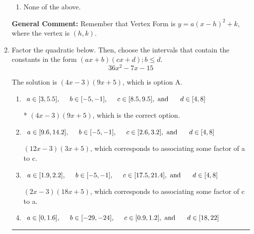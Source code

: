 \documentclass{extbook}[14pt]
\newcommand{\litem}[1]{\item #1

\rule{\textwidth}{0.4pt}}
\begin{document}
\begin{enumerate}
{\begin{enumerate}[label=\Alph*.]
\item None of the above.\end{enumerate}
\textbf{General Comment:} Remember that Vertex Form is $y = a(x-h)^2+k$, where the vertex is $(h, k)$.
}
\litem{
Factor the quadratic below. Then, choose the intervals that contain the constants in the form $(ax+b)(cx+d); b \leq d.$
\[ 36x^{2} -7 x -15 \]

The solution is \( (4x -3)(9x + 5) \), which is option A.\begin{enumerate}[label=\Alph*.]
\item \( a \in [3, 5.5], \hspace*{5mm} b \in [-5, -1], \hspace*{5mm} c \in [8.5, 9.5], \text{ and } \hspace*{5mm} d \in [4, 8] \)

* $(4x -3)(9x + 5)$, which is the correct option.
\item \( a \in [9.6, 14.2], \hspace*{5mm} b \in [-5, -1], \hspace*{5mm} c \in [2.6, 3.2], \text{ and } \hspace*{5mm} d \in [4, 8] \)

 $(12x -3)(3x + 5)$, which corresponds to associating some factor of a to c.
\item \( a \in [1.9, 2.2], \hspace*{5mm} b \in [-5, -1], \hspace*{5mm} c \in [17.5, 21.4], \text{ and } \hspace*{5mm} d \in [4, 8] \)

 $(2x -3)(18x + 5)$, which corresponds to associating some factor of c to a.
\item \( a \in [0, 1.6], \hspace*{5mm} b \in [-29, -24], \hspace*{5mm} c \in [0.9, 1.2], \text{ and } \hspace*{5mm} d \in [18, 22] \)


\end{enumerate}}
\end{enumerate}
\end{document}
